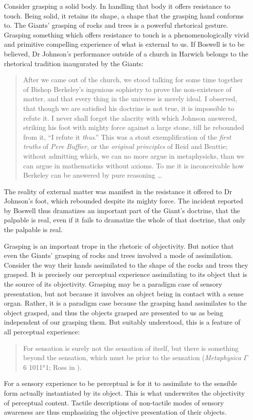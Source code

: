 Consider grasping a solid body. In handling that body it offers resistance to touch. Being solid, it retains its shape, a shape that the grasping hand conforms to. The Giants' grasping of rocks and trees is a powerful rhetorical gesture. Grasping something which offers resistance to touch is a phenomenologically vivid and primitive compelling experience of what is external to us. If Boswell is to be believed, Dr Johnson's performance outside of a church in Harwich belongs to the rhetorical tradition inaugurated by the Giants: 
\begin{quote}
	After we came out of the church, we stood talking for some time together of Bishop Berkeley's ingenious sophistry to prove the non-exist\-ence of matter, and that every thing in the universe is merely ideal. I observed, that though we are satisfied his doctrine is not true, it is impossible to refute it. I never shall forget the alacrity with which Johnson answered, striking his foot with mighty force against a large stone, till he rebounded from it, ``I refute it \emph{thus}.'' This was a stout exemplification of the \emph{first truths} of \emph{Pere Buffier}, or the \emph{original principles} of Reid and Beattie; without admitting which, we can no more argue in metaphysicks, than we can argue in mathematicks without axioms. To me it is inconceivable how Berkeley can be answered by pure reasoning \ldots\ \citep[\textsc{i} 471]{Boswell:1935fk}
\end{quote}
The reality of external matter was manifest in the resistance it offered to Dr Johnson's foot, which rebounded despite its mighty force. The incident reported by Boswell thus dramatizes an important part of the Giant's doctrine, that the palpable is real, even if it fails to dramatize the whole of that doctrine, that only the palpable is real.
 
Grasping is an important trope in the rhetoric of objectivity. But notice that even the Giants' grasping of rocks and trees involved a mode of assimilation. Consider the way their hands assimilated to the shape of the rocks and trees they grasped. It is precisely our perceptual experience assimilating to its object that is the source of its objectivity.  Grasping may be a paradigm case of sensory presentation, but not because it involves an object being in contact with a sense organ. Rather, it is a paradigm case because the grasping hand assimilates to the object grasped, and thus the objects grasped are presented to us as being independent of our grasping them. But suitably understood, this is a feature of all perceptual experience:
\begin{quote}
	For sensation is surely not the sensation of itself, but there is something beyond the sensation, which must be prior to the sensation (\emph{Metaphysica} \( \Gamma \) 6 1011\( ^{a} \)1; Ross in \citealt[56]{Barnes:1984kx}).
\end{quote}
For a sensory experience to be perceptual is for it to assimilate to the sensible form actually instantiated by its object. This is what underwrites the objectivity of perceptual content. Tactile descriptions of non-tactile modes of sensory awareness are thus emphasizing the objective presentation of their objects.

